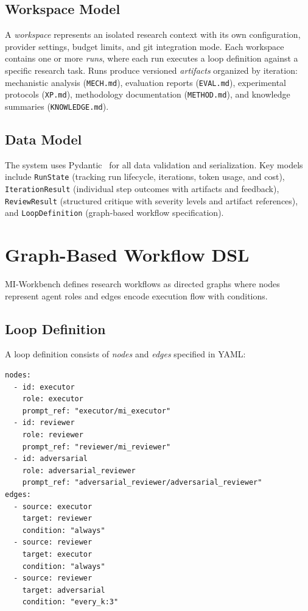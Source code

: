 \documentclass[10pt]{article}
\begin{document}
\subsection{Workspace Model}
A \emph{workspace} represents an isolated research context with its own configuration, provider settings, budget limits, and git integration mode. Each workspace contains one or more \emph{runs}, where each run executes a loop definition against a specific research task. Runs produce versioned \emph{artifacts} organized by iteration: mechanistic analysis (\texttt{MECH.md}), evaluation reports (\texttt{EVAL.md}), experimental protocols (\texttt{XP.md}), methodology documentation (\texttt{METHOD.md}), and knowledge summaries (\texttt{KNOWLEDGE.md}).

\subsection{Data Model}
The system uses Pydantic~\citep{pydantic} for all data validation and serialization. Key models include \texttt{RunState} (tracking run lifecycle, iterations, token usage, and cost), \texttt{IterationResult} (individual step outcomes with artifacts and feedback), \texttt{ReviewResult} (structured critique with severity levels and artifact references), and \texttt{LoopDefinition} (graph-based workflow specification).


\section{Graph-Based Workflow DSL}
\label{sec:dsl}

MI-Workbench defines research workflows as directed graphs where nodes represent agent roles and edges encode execution flow with conditions.

\subsection{Loop Definition}
A loop definition consists of \emph{nodes} and \emph{edges} specified in YAML:

\begin{lstlisting}[caption={Excerpt from the \texttt{executor\_reviewer} loop definition.}]
nodes:
  - id: executor
    role: executor
    prompt_ref: "executor/mi_executor"
  - id: reviewer
    role: reviewer
    prompt_ref: "reviewer/mi_reviewer"
  - id: adversarial
    role: adversarial_reviewer
    prompt_ref: "adversarial_reviewer/adversarial_reviewer"
edges:
  - source: executor
    target: reviewer
    condition: "always"
  - source: reviewer
    target: executor
    condition: "always"
  - source: reviewer
    target: adversarial
    condition: "every_k:3"
\end{lstlisting}
\end{document}
